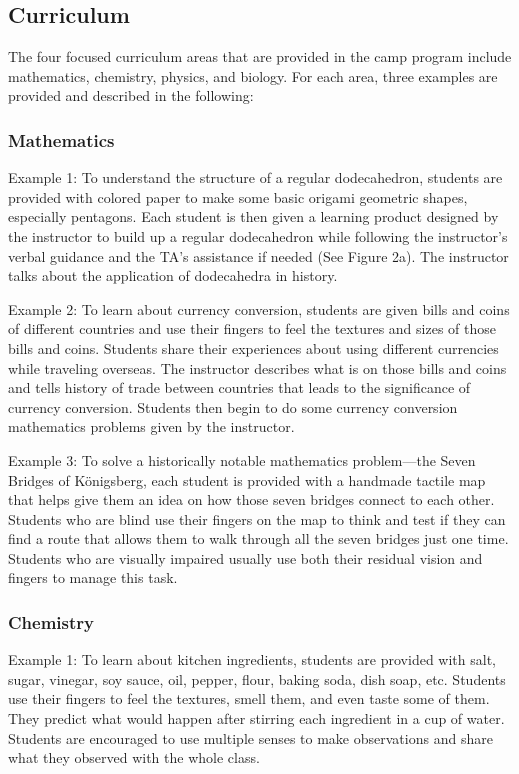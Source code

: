 \documentclass[11.5pt]{sig-alternate} %
\begin{document}
\begin{large}
\subsection*{Curriculum}

The four focused curriculum areas that are provided in the camp program include mathematics, chemistry, physics, and biology. For each area, three examples are provided and described in the following:

\subsubsection*{Mathematics}

Example 1: To understand the structure of a regular dodecahedron, students are provided with colored paper to make some basic origami geometric shapes, especially pentagons. Each student is then given a learning product designed by the instructor to build up a regular dodecahedron while following the instructor’s verbal guidance and the TA’s assistance if needed (See Figure 2a). The instructor talks about the application of dodecahedra in history.

Example 2: To learn about currency conversion, students are given bills and coins of different countries and use their fingers to feel the textures and sizes of those bills and coins. Students share their experiences about using different currencies while traveling overseas. The instructor describes what is on those bills and coins and tells history of trade between countries that leads to the significance of currency conversion. Students then begin to do some currency conversion mathematics problems given by the instructor. 

Example 3: To solve a historically notable mathematics problem—the Seven Bridges of Königsberg, each student is provided with a handmade tactile map that helps give them an idea on how those seven bridges connect to each other. Students who are blind use their fingers on the map to think and test if they can find a route that allows them to walk through all the seven bridges just one time. Students who are visually impaired usually use both their residual vision and fingers to manage this task.

\subsubsection*{Chemistry}

Example 1: To learn about kitchen ingredients, students are provided with salt, sugar, vinegar, soy sauce, oil, pepper, flour, baking soda, dish soap, etc. Students use their fingers to feel the textures, smell them, and even taste some of them. They predict what would happen after stirring each ingredient in a cup of water. Students are encouraged to use multiple senses to make observations and share what they observed with the whole class.


\end{large}
\end{document}
